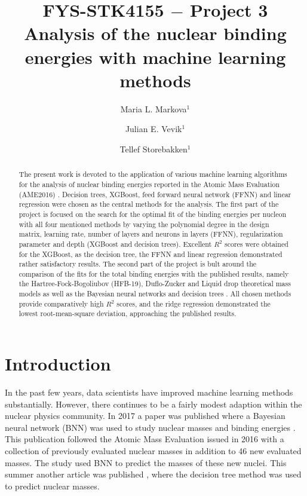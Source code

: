 \documentclass[numberedappendix, twocolappendix]{emulateapj}
\begin{document}
\title{FYS-STK4155 $-$ Project 3\\
Analysis of the nuclear binding energies with machine learning methods}

\author{Maria L. Markova$^1$}

\author{Julian E. Vevik$^1$}

\author{Tellef Storebakken$^1$}





\begin{abstract}
The present work is devoted to the application of various machine learning algorithms for the analysis of nuclear binding energies reported in the Atomic Mass Evaluation (AME2016) \cite{ame16}. Decision trees, XGBoost, feed forward neural network (FFNN) and linear regression were chosen as the central methods for the analysis. The first part of the project is focused on the search for the optimal fit of the binding energies per nucleon with all four mentioned methods by varying the polynomial degree in the design matrix, learning rate, number of layers and neurons in layers (FFNN), regularization parameter and depth (XGBoost and decision trees). Excellent $R^2$ scores were obtained for the XGBoost, as the decision tree, the FFNN and linear regression demonstrated rather satisfactory  results. The second part of the project is bult around the comparison of the fits for the total binding energies with the published results, namely the Hartree-Fock-Bogoliubov (HFB-19), Duflo-Zucker and Liquid drop theoretical  mass models as well as the Bayesian neural networks and decision trees \cite{utama2017, trees in nuclear}. All chosen methods provide comparatively high $R^2$ scores, and the ridge regression demonstrated the lowest root-mean-square deviation, approaching the published results.
\end{abstract}


\section{Introduction}
\label{sec: introduction}
In the past few years, data scientists have improved machine learning methods substantially. However, there continues to be a fairly modest adaption within the nuclear physics community. In 2017 a paper was published where a Bayesian neural network (BNN)  was used to study nuclear masses and binding energies \cite{utama2017}. This publication followed the Atomic Mass Evaluation \cite{ame16} issued in 2016 with a collection of previously evaluated nuclear masses in addition to 46 new evaluated masses. The study used BNN to predict the masses of these new nuclei. This summer another article was published \cite{trees in nuclear}, where the decision tree method was used to predict nuclear masses.
\end{document}
